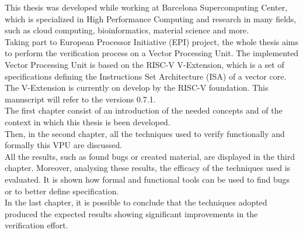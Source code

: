 \summary
\english

This thesis was developed while working at Barcelona Supercomputing Center, which is specialized in High Performance Computing and research in many fields, such as cloud computing, bioinformatics, material science and more.\\


Taking part to European Processor Initiative (EPI) project, the whole thesis aims to perform the verification process on a Vector Processing Unit.
The implemented Vector Processing Unit is based on the RISC-V V-Extension, which is a set of specifications defining the Instructions Set Architecture (ISA) of a vector core. The V-Extension is currently on develop by the RISC-V foundation. This manuscript will refer to the versions 0.7.1.\\

The   first  chapter consist of an introduction of the needed concepts and of the context in which this thesis is been developed.\\

Then, in the second chapter, all the techniques used to verify functionally and formally this VPU are discussed.\\

All the results, such as found bugs or created material, are displayed in the third chapter. Moreover, analysing these results, the efficacy of the techniques used is evaluated. It is shown how formal and functional tools can be used to find bugs or to better define specification. \\

In the last chapter, it is possible to conclude that the techniques  adopted produced the expected results showing significant improvements in the verification effort.








\bigskip
